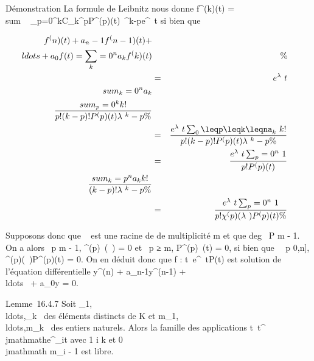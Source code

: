 \documentclass[]{article}
\begin{document}
Démonstration La formule de Leibnitz nous donne f^(k)(t)
= \\sum ~
_p=0^kC_k^pP^(p)(t)\lambda~^k-pe^\lambda~t
si bien que

\begin{align*} f^(n)(t) + a_
n-1f^(n-1)(t) +
\\ldots + a_
0f(t) = \sum _k=0^na_
kf^(k)(t)&&\%& \\ & =&
e^\lambda~t \\sum
_k=0^na_ k \\sum
_p=0^k k! \over p!(k - p)!
P^(p)(t)\lambda~^k-p \%&
\\ & =& e^\lambda~t
\sum _0\leqp\leqk\leqna_k~ k!
\over p!(k - p)! P^(p)(t)\lambda~^k-p
\%& \\ & =& e^\lambda~t
\sum _p=0^n~ 1
\over p! P^(p)(t)\\sum
_k=p^na_ k k! \over (k - p)!
\lambda~^k-p\%& \\ & =&
e^\lambda~t \sum _p=0^n~ 1
\over p! \chi^(p)(\lambda~)P^(p)(t) \%&
\\ \end{align*}

Supposons donc que \lambda~ est une racine de \chi de multiplicité m et que
deg~ P \leq m - 1. On a alors
\forall~p \leq m - 1, \chi^(p)~(\lambda~) = 0 et
\forall~p ≥ m, P^(p)~(t) = 0, si bien que
\forall~~p \in {[}0,n{]},
\chi^(p)(\lambda~)P^(p)(t) = 0. On en déduit donc que f :
t\mapsto~e^\lambda~tP(t) est solution de
l'équation différentielle y^(n) +
a_n-1y^(n-1) +
\\ldots~ +
a_0y = 0.

Lemme~16.4.7 Soit
\lambda_1,\\ldots,\lambda_k~
des éléments distincts de K et
m_1,\\ldots,m_k~
des entiers naturels. Alors la famille des applications
t\mapsto~t^\\jmathmathe^\lambda_it
avec 1 \leq i \leq k et 0 \leq \\jmathmath \leq m_i - 1 est libre.
\end{document}

